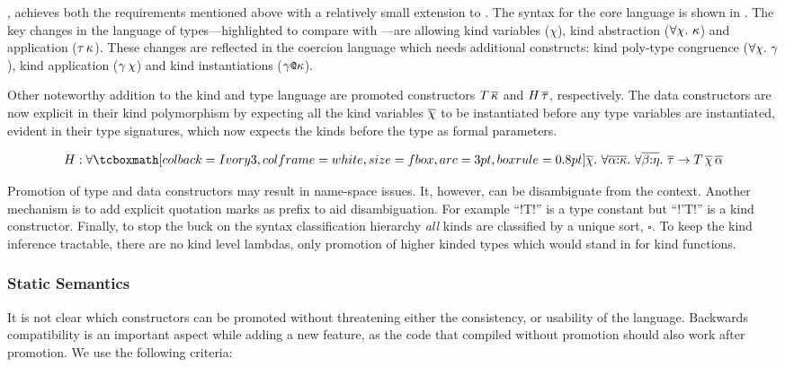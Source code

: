 \documentclass[screen,nonacm,manuscript,review]{acmart} %
\begin{document}
\SFP\cite{yorgey_giving_2012}, achieves both the requirements mentioned above with a relatively small extension to \SFC. The syntax for the core language is shown in . The key changes in the language of types---highlighted to compare with \SFC---are allowing kind variables ($\chi$), kind abstraction ($\forall\chi.~\kappa$) and application ($\tau\, \kappa$). These changes are reflected in the coercion language which needs additional constructs: kind poly-type congruence ($\forall\chi.~\gamma$), kind application ($\gamma\,\chi$) and kind instantiations ($\gamma\texttt{@}\kappa$).

Other noteworthy addition to the kind and type language are promoted constructors $T\,\overline{\kappa}$ and $H\,\overline{\tau}$, respectively. The data constructors are now explicit in their kind polymorphism by expecting all the kind variables $\overline{\chi}$ to be instantiated before any type variables are instantiated, evident in their type signatures, which now expects the kinds before the type as formal parameters.

$$
H : \Forall {\shl{\many\chi}} {\Forall {\many{\TyVar\co\kappa}}
  {\Forall {\many{\beta\co\eta}} {\many\tau \to T
      \App\many{\chi}\App\many{\TyVar}}}}
$$

Promotion of type and data constructors may result in name-space issues. It, however, can be disambiguate from the context. Another mechanism is to add explicit quotation marks as prefix to aid disambiguation.
For example ``!T!'' is a type constant but ``!'T!'' is a kind constructor.
Finally, to stop the buck on the syntax classification hierarchy \emph{all} kinds are classified by a unique sort, $\square$. To keep the kind inference tractable, there are no kind level lambdas, only promotion of higher kinded types which would stand in for kind functions.

\subsubsection{Static Semantics}
It is not clear which constructors can be promoted without threatening
either the consistency, or usability of the language. Backwards
compatibility is an important aspect while adding a new feature, as
the code that compiled without promotion should also work after
promotion. We use the following criteria:
\end{document}

